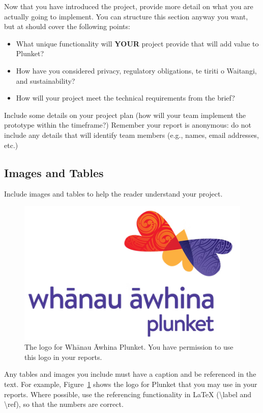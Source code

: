 \documentclass{capstone}
\begin{document}

Now that you have introduced the project, provide more detail on what you are actually going to implement. You can structure this section anyway you want, but at should cover the following points:

\begin{itemize}
    \item What unique functionality will \textbf{YOUR} project provide that will add value to Plunket?
    \item How have you considered privacy, regulatory obligations, te tiriti o Waitangi, and sustainability?
    \item How will your project meet the technical requirements from the brief?
\end{itemize}


Include some details on your project plan (how will your team implement the prototype within the timeframe?) Remember your report is anonymous: do not include any details that will identify team members (e.g., names, email addresses, etc.)

\subsection*{Images and Tables}

Include images and tables to help the reader understand your project. 

\begin{figure}[h!]
    \centering
    \includegraphics{plunket-medium}
    \caption{The logo for Whānau Āwhina Plunket. You have permission to use this logo in your reports.}
    \label{fig:logo}
\end{figure}

Any tables and images you include must have a caption and be referenced in the text. For example, Figure~\ref{fig:logo} shows the logo for Plunket that you may use in your reports. Where possible, use the referencing functionality in \LaTeX{} (\textbackslash label and \textbackslash ref), so that the numbers are correct.
\end{document}
